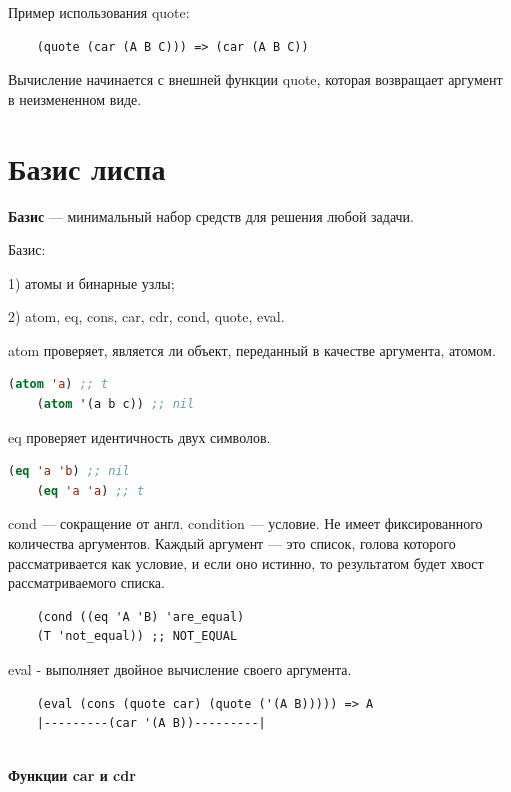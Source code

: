 Пример использования quote:
\begin{lstlisting}
	(quote (car (A B C))) => (car (A B C))
\end{lstlisting}


Вычисление начинается с внешней функции quote, которая возвращает аргумент в неизмененном виде.

\section{Базис лиспа}

\textbf{Базис} --- минимальный набор средств для решения любой задачи.

Базис:

1) атомы и бинарные узлы;

2) atom, eq, cons, car, cdr, cond, quote, eval.

atom проверяет, является ли объект, переданный в качестве аргумента, атомом.

\begin{lstlisting}[language=Lisp]
	(atom 'a) ;; t
	(atom '(a b c)) ;; nil
\end{lstlisting}

eq проверяет идентичность двух символов.
\begin{lstlisting}[language=Lisp]
	(eq 'a 'b) ;; nil
	(eq 'a 'a) ;; t
\end{lstlisting}

cond --- сокращение от англ. condition --– условие. 
Не имеет фиксированного количества аргументов.
Каждый аргумент --- это список, голова которого рассматривается как условие, 
и если оно истинно, то результатом будет хвост рассматриваемого списка.

\begin{lstlisting}
	(cond ((eq 'A 'B) 'are_equal)
	(T 'not_equal)) ;; NOT_EQUAL
\end{lstlisting}

eval - выполняет двойное вычисление своего аргумента.

\begin{lstlisting}
	(eval (cons (quote car) (quote ('(A B))))) => A
	|---------(car '(A B))---------|
	
\end{lstlisting}


\textbf{Функции car и cdr}


